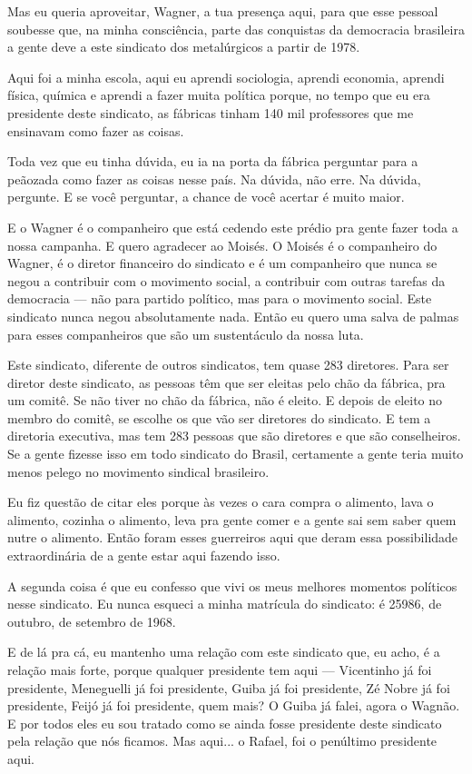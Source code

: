 Mas eu queria aproveitar, Wagner, a tua presença aqui, para que
esse pessoal soubesse que, na minha consciência, parte das conquistas da
democracia brasileira a gente deve a este sindicato dos metalúrgicos a
partir de 1978.

Aqui foi a minha escola, aqui eu aprendi sociologia, aprendi
economia, aprendi física, química e aprendi a fazer muita política
porque, no tempo que eu era presidente deste sindicato, as fábricas
tinham 140 mil professores que me ensinavam como fazer as coisas.

Toda vez que eu tinha dúvida, eu ia na porta da fábrica perguntar
para a peãozada como fazer as coisas nesse país. Na dúvida, não erre. Na
dúvida, pergunte. E se você perguntar, a chance de você acertar é muito
maior.

E o Wagner é o companheiro que está cedendo este prédio pra gente
fazer toda a nossa campanha. E quero agradecer ao Moisés. O Moisés é o
companheiro do Wagner, é o diretor financeiro do sindicato e é um
companheiro que nunca se negou a contribuir com o movimento social, a
contribuir com outras tarefas da democracia --- não para partido
político, mas para o movimento social. Este sindicato nunca negou
absolutamente nada. Então eu quero uma salva de palmas para esses
companheiros que são um sustentáculo da nossa luta.

Este sindicato, diferente de outros sindicatos, tem quase 283
diretores. Para ser diretor deste sindicato, as pessoas têm que ser
eleitas pelo chão da fábrica, pra um comitê. Se não tiver no chão da
fábrica, não é eleito. E depois de eleito no membro do comitê, se
escolhe os que vão ser diretores do sindicato. E tem a diretoria
executiva, mas tem 283 pessoas que são diretores e que são conselheiros.
Se a gente fizesse isso em todo sindicato do Brasil, certamente a gente
teria muito menos pelego no movimento sindical brasileiro.

Eu fiz questão de citar eles porque às vezes o cara compra o
alimento, lava o alimento, cozinha o alimento, leva pra gente comer e a
gente sai sem saber quem nutre o alimento. Então foram esses guerreiros
aqui que deram essa possibilidade extraordinária de a gente estar aqui
fazendo isso.

A segunda coisa é que eu confesso que vivi os meus melhores
momentos políticos nesse sindicato. Eu nunca esqueci a minha matrícula
do sindicato: é 25986, de outubro, de setembro de
1968.

E de lá pra cá, eu mantenho uma relação com este sindicato que, eu
acho, é a relação mais forte, porque qualquer presidente tem aqui ---
Vicentinho já foi presidente, Meneguelli já foi presidente, Guiba já foi
presidente, Zé Nobre já foi presidente, Feijó já foi presidente, quem
mais? O Guiba já falei, agora o Wagnão. E por todos eles eu sou tratado
como se ainda fosse presidente deste sindicato pela relação que nós
ficamos. Mas aqui... o Rafael, foi o penúltimo presidente aqui.

